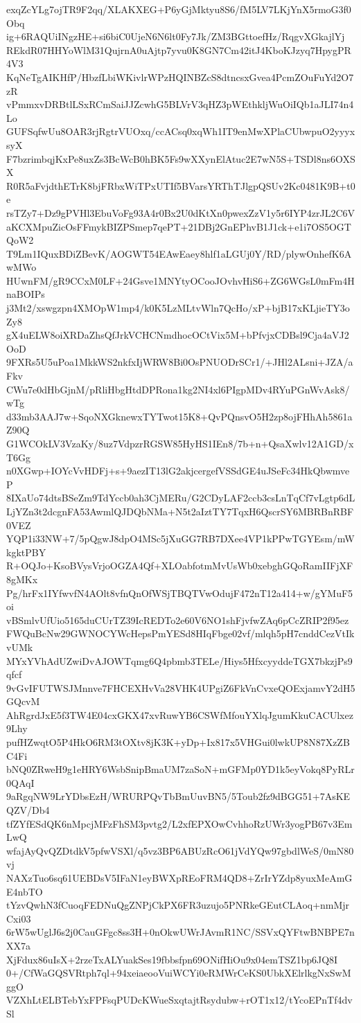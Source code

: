 exqZcYLg7ojTR9F2qq/XLAKXEG+P6yGjMktyu8S6/fM5LV7LKjYnX5rmoG3f0Obq
ig+6RAQUiINgzHE+si6biC0UjeN6N6lt0Fy7Jk/ZM3BGttoefHz/RqgvXGkajlYj
REkdR07HHYoWlM31QujrnA0uAjtp7yvu0K8GN7Cm42itJ4KboKJzyq7HpygPR4V3
KqNeTgAIKHfP/HbzfLbiWKivlrWPzHQINBZcS8dtncsxGvea4PcmZOuFuYd2O7zR
vPmmxvDRBtlLSxRCmSaiJJZcwhG5BLVrV3qHZ3pWEthkljWuOiIQb1aJLI74n4Lo
GUFSqfwUu8OAR3rjRgtrVUOxq/ccACsq0xqWh1IT9enMwXPlaCUbwpuO2yyyxsyX
F7bzrimbqjKxPe8uxZs3BcWcB0hBK5Fs9wXXynElAtuc2E7wN5S+TSDl8ns6OXSX
R0R5aFvjdthETrK8bjFRbxWiTPxUTIf5BVarsYRThTJlgpQSUv2Kc0481K9B+t0e
rsTZy7+Dz9gPVHl3EbuVoFg93A4r0Bx2U0dKtXn0pwexZzV1y5r6IYP4zrJL2C6V
aKCXMpuZicOsFFmykBIZPSmep7qePT+21DBj2GnEPhvB1J1ck+e1i7OS5OGTQoW2
T9Lm1IQuxBDiZBevK/AOGWT54EAwEaey8hlf1aLGUj0Y/RD/plywOnhefK6AwMWo
HUwnFM/gR9CCxM0LF+24Gsve1MNYtyOCooJOvhvHiS6+ZG6WGsL0mFm4HnaBOIPs
j3Mt2/xswgzpn4XMOpW1mp4/k0K5LzMLtvWln7QcHo/xP+bjB17xKLjieTY3oZy8
gX4uELW8oiXRDaZhsQfJrkVCHCNmdhocOCtVix5M+bPfvjxCDBsl9Cja4aVJ2OoD
9FXRs5U5uPoa1MkkWS2nkfxIjWRW8Bi0OsPNUODrSCr1/+JHl2ALsni+JZA/aFkv
CWu7e0dHbGjnM/pRliHbgHtdDPRona1kg2NI4xl6PIgpMDv4RYuPGnWvAsk8/wTg
d33mb3AAJ7w+SqoNXGknewxTYTwot15K8+QvPQnsvO5H2zp8ojFHhAh5861aZ90Q
G1WCOkLV3VzaKy/8uz7VdpzrRGSW85HyHS1IEn8/7b+n+QsaXwlv12A1GD/xT6Gg
n0XGwp+IOYcVvHDFj+s+9aezIT13lG2akjcergefVSSdGE4uJSeFc34HkQbwmveP
8IXaUo74dtsBSeZm9TdYccb0ah3CjMERu/G2CDyLAF2ccb3csLnTqCf7vLgtp6dL
LjYZn3t2dcgnFA53AwmlQJDQbNMa+N5t2aIztTY7TqxH6QscrSY6MBRBnRBF0VEZ
YQP1i33NW+7/5pQgwJ8dpO4MSc5jXuGG7RB7DXee4VP1kPPwTGYEsm/mWkgktPBY
R+OQJo+KsoBVysVrjoOGZA4Qf+XLOabfotmMvUsWb0xebghGQoRamIIFjXF8gMKx
Pg/hrFx1IYfwvfN4AOlt8vfnQnOfWSjTBQTVwOdujF472nT12a414+w/gYMuF5oi
vBSmlvUfUio5165duCUrTZ39IcREDTo2e60V6NO1shFjvfwZAq6pCcZRIP2f95ez
FWQuBcNw29GWNOCYWcHepsPmYESd8HIqFbge02vf/mlqh5pH7cnddCezVtIkvUMk
MYxYVhAdUZwiDvAJOWTqmg6Q4pbmb3TELe/Hiys5HfxcyyddeTGX7bkzjPs9qfcf
9vGvIFUTWSJMnnve7FHCEXHvVa28VHK4UPgiZ6FkVnCvxeQOExjamvY2dH5GQcvM
AhRgrdJxE5f3TW4E04cxGKX47xvRuwYB6CSWfMfouYXlqJgumKkuCACUlxez9Lhy
pufHZwqtO5P4HkO6RM3tOXtv8jK3K+yDp+Ix817x5VHGui0lwkUP8N87XzZBC4Fi
bNQ0ZRweH9g1eHRY6WsbSnipBmaUM7zaSoN+mGFMp0YD1k5eyVokq8PyRLr0QAqI
9aRgqNW9LrYDbsEzH/WRURPQvTbBmUuvBN5/5Toub2fz9dBGG51+7AsKEQZV/Db4
tfZYfESdQK6nMpcjMFzFhSM3pvtg2/L2xfEPXOwCvhhoRzUWr3yogPB67v3EmLwQ
wfajAyQvQZDtdkV5pfwVSXl/q5vz3BP6ABUzRcO61jVdYQw97gbdlWeS/0mN80vj
NAXzTuo6sq61UEBDsV5IFaN1eyBWXpREoFRM4QD8+ZrIrYZdp8yuxMeAmGE4nbTO
tYzvQwhN3fCuoqFEDNuQgZNPjCkPX6FR3uzujo5PNRkeGEutCLAoq+nmMjrCxi03
6rW5wUglJ6s2j0CauGFgc8ss3H+0nOkwUWrJAvmR1NC/SSVxQYFtwBNBPE7nXX7a
XjFdux86uIsX+2rzeTxALYuakSes19fbbsfpn69ONifHiOu9x04emTSZ1bp6JQ8I
0+/CfWaGQSVRtph7ql+94xeiaeooVuiWCYi0eRMWrCeKS0UbkXElrlkgNxSwMggO
VZXhLtELBTebYxFPFsqPUDcKWueSxqtajtRsydubw+rOT1x12/tYcoEPnTf4dvSl
